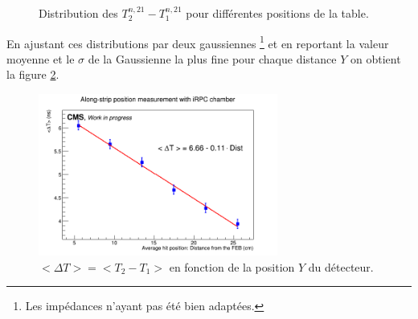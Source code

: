 \begin{figure}[ht!]
	\hfill
	\caption{Distribution des $T^{n,21}_2-T^{n,21}_1$ pour différentes positions de la table.}
	\label{move}
\end{figure}

En ajustant ces distributions par deux gaussiennes \footnote{Les impédances n'ayant pas été bien adaptées.} et en reportant la valeur moyenne et le $\sigma$ de la Gaussienne la plus fine pour chaque distance $Y$ on obtient la figure \ref{Fit}.

\begin{figure}[!ht]
	\centering
	\includegraphics[width=0.7\textwidth]{ELE/MeanT_Pos.jpg}
	\caption{$<\Delta T>=<T_2-T_1>$ en fonction de la position $Y$ du détecteur.}
	\label{Fit}
\end{figure}

